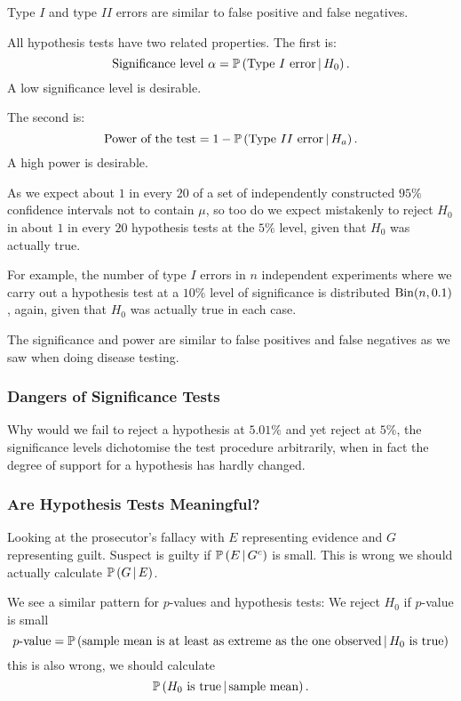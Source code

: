 \documentclass[10pt, a4paper]{article}
\begin{document}
\begin{remark}
    Type $I$ and type $II$ errors are similar to false positive and false negatives.
\end{remark}

\begin{definition}
    All hypothesis tests have two related properties.
    The first is:
    \[
    \text{Significance level $\alpha$} = \mathbb{P}\left(\text{Type $I$ error} \,\middle|\, H_0\right).
    \]
    A low significance level is desirable.

    The second is:
    \[
    \text{Power of the test} = 1 - \mathbb{P}\left(\text{Type $II$ error} \,\middle|\, H_a\right).
    \]
    A high power is desirable.
\end{definition}

As we expect about $1$ in every $20$ of a set of independently constructed $95\%$ confidence intervals not to contain $\mu$,
so too do we expect mistakenly to reject $H_0$ in about $1$ in every $20$ hypothesis tests at the $5\%$ level,
given that $H_0$ was actually true.

For example,
the number of type $I$ errors in $n$ independent experiments where we carry out a hypothesis test at a $10\%$ level of significance is distributed $\operatorname{Bin}(n, 0.1)$,
again,
given that $H_0$ was actually true in each case.

The significance and power are similar to false positives and false negatives as we saw when doing disease testing.

\subsubsection{Dangers of Significance Tests}
Why would we fail to reject a hypothesis at $5.01\%$ and yet reject at $5\%$,
the significance levels dichotomise the test procedure arbitrarily,
when in fact the degree of support for a hypothesis has hardly changed.

\subsubsection{Are Hypothesis Tests Meaningful?}
Looking at the prosecutor's fallacy with $E$ representing evidence and $G$ representing guilt.
Suspect is guilty if $\mathbb{P}\left(E \,\middle|\, G ^ c\right)$ is small.
This is wrong we should actually calculate $\mathbb{P}\left(G \,\middle|\, E\right)$.

We see a similar pattern for $p$-values and hypothesis tests:
We reject $H_0$ if $p$-value is small
\[
p\text{-value} = \mathbb{P}\left(\text{sample mean is at least as extreme as the one observed} \,\middle|\, H_0\text{ is true}\right)
\]
this is also wrong,
we should calculate
\[
\mathbb{P}\left(\text{$H_0$ is true} \,\middle|\, \text{sample mean}\right).
\]
\end{document}
